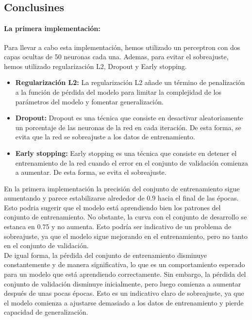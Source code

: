 \documentclass{report}
\begin{document}
      \subsection*{Conclusines}
        \paragraph*{La primera implementación:}
        {
          Para llevar a cabo esta implementación, hemos utilizado un perceptron con dos capas ocultas de 50 neuronas cada una.
          Ademas, para evitar el sobreajuste, hemos utilizado regularización L2, Dropout y Early stopping.
          
          \begin{itemize}
            \item \textbf{Regularización L2:} La regularización L2 añade un término de penalización a la función de pérdida del modelo para limitar la complejidad de los parámetros del modelo y fomentar generalización.
            \item \textbf{Dropout:} Dropout es una técnica que consiste en desactivar aleatoriamente un porcentaje de las neuronas de la red en cada iteración. De esta forma, se evita que la red se sobreajuste a los datos de entrenamiento.
            \item \textbf{Early stopping:} Early stopping es una técnica que consiste en detener el entrenamiento de la red cuando el error en el conjunto de validación comienza a aumentar. De esta forma, se evita el sobreajuste.
          \end{itemize}

          En la primera implementación la precisión del conjunto de entrenamiento sigue aumentando y parece estabilizarse alrededor de 0.9 hacia el final de las épocas. Esto podria sugerir que el modelo está aprendiendo bien los patrones del conjunto de entrenamiento.
          No obstante, la curva con el conjunto de desarrollo se estanca en 0.75 y no aumenta. Esto podría ser indicativo de un problema de sobreajuste, ya que el modelo sigue mejorando en el entrenamiento, pero no tanto en el conjunto de validación.\\

          De igual forma, la pérdida del conjunto de entrenamiento disminuye constantemente y de manera significativa, lo que es un comportamiento esperado para un modelo que está aprendiendo correctamente.
          Sin embargo, la pérdida del conjunto de validación disminuye inicialmente, pero luego comienza a aumentar después de unas pocas épocas. Esto es un indicativo claro de sobreajuste, ya que el modelo comienza a ajustarse demasiado a los datos de entrenamiento y pierde capacidad de generalización.
        }
\end{document}
